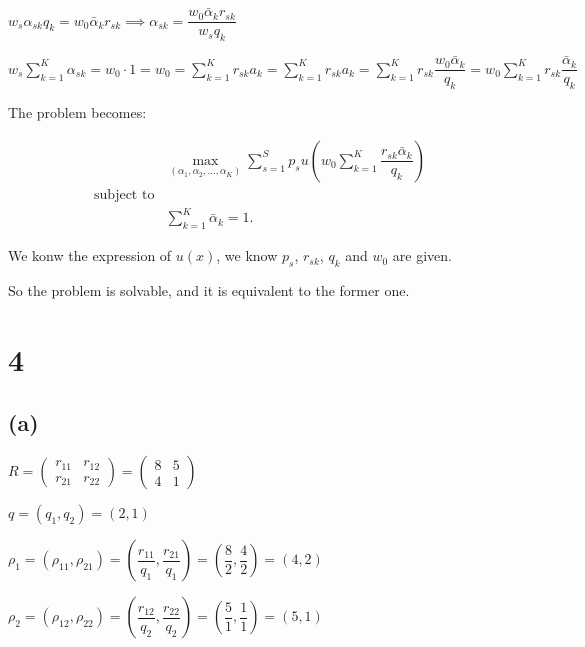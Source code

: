 \documentclass{article}
\begin{document}
$w_{s}\alpha_{sk}q_{k}=w_{0}\bar{\alpha}_{k}r_{sk}\implies\alpha_{sk}=\dfrac{w_{0}\bar{\alpha}_{k}r_{sk}}{w_{s}q_{k}}$

$w_{s}\displaystyle\sum_{k=1}^{K}\alpha_{sk}=w_{0}\cdot1=w_{0}=\displaystyle\sum_{k=1}^{K}r_{sk}a_{k}=\displaystyle\sum_{k=1}^{K}r_{sk}a_{k}=\displaystyle\sum_{k=1}^{K}r_{sk}\dfrac{w_{0}\bar{\alpha}_{k}}{q_{k}}=w_{0}\displaystyle\sum_{k=1}^{K}r_{sk}\dfrac{\bar{\alpha}_{k}}{q_{k}}$

The problem becomes:

\begin{equation*}
    \begin{aligned}
    & \max_{\left(\alpha_{1}, \alpha_{2}, ..., \alpha_{K}\right)}
    \sum_{s=1}^{S}p_{s}u\left(w_{0}\displaystyle\sum_{k=1}^{K}\dfrac{r_{sk}\bar{\alpha}_{k}}{q_{k}}\right)\\
      \text{subject to}\\
    &  \displaystyle\sum_{k=1}^{K}\bar{\alpha}_{k}=1.
    \end{aligned}
\end{equation*}

We konw the expression of $u\left(x\right)$, we know $p_{s}$, $r_{sk}$, $q_{k}$ and $w_{0}$ are given.

So the problem is solvable, and it is equivalent to the former one.

\section*{4}

\subsection*{(a)}

$R=\begin{pmatrix}
    r_{11} & r_{12} \\
    r_{21} & r_{22}
\end{pmatrix}=\begin{pmatrix}
    8 & 5 \\
    4 & 1
\end{pmatrix}$

$q=\left(q_{1}, q_{2}\right)=\left(2, 1\right)$

$\rho_{1}=\left(\rho_{11}, \rho_{21}\right)=\left(\dfrac{r_{11}}{q_{1}}, \dfrac{r_{21}}{q_{1}}\right)=\left(\dfrac{8}{2}, \dfrac{4}{2}\right)=\boxed{\left(4, 2\right)}$

$\rho_{2}=\left(\rho_{12}, \rho_{22}\right)=\left(\dfrac{r_{12}}{q_{2}}, \dfrac{r_{22}}{q_{2}}\right)=\left(\dfrac{5}{1}, \dfrac{1}{1}\right)=\boxed{\left(5, 1\right)}$
\end{document}
